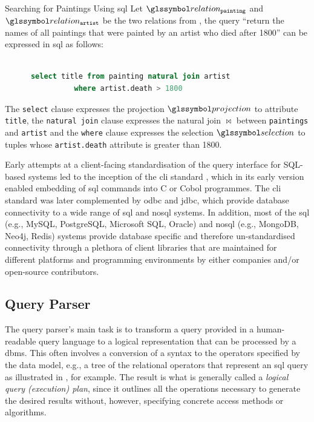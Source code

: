 \begin{example}[label=example:sql_query]{Searching for Paintings Using \acrshort{sql}}{}
    Let  $\relation_{\mathtt{painting}}$ and $\relation_{\mathtt{artist}}$ be the two relations from , the query ``return the names of all paintings that were painted by an artist who died after 1800'' can be expressed in \acrshort{sql} as follows:

    \begin{lstlisting}[language=SQL, showspaces=false, basicstyle=\ttfamily, numbers=none]

      select title from painting natural join artist 
                where artist.death > 1800
    \end{lstlisting}

    The \texttt{select} clause expresses the projection $\projection$ to attribute \texttt{title}, the \texttt{natural join} clause expresses the natural join $\Join$ between \texttt{paintings} and \texttt{artist} and the \texttt{where} clause expresses the selection $\selection$ to tuples whose \texttt{artist.death} attribute is greater than 1800.
\end{example}

Early attempts at a client-facing standardisation of the query interface for SQL-based systems led to the inception of the \acrfull{cli} standard \cite{XOpen:1995CLI}, which in its early version enabled embedding of \acrshort{sql} commands into C or Cobol programmes. The \acrshort{cli} standard was later complemented by \acrfull{odbc} and \acrfull{jdbc}, which provide database connectivity to a wide range of \acrshort{sql} and \acrshort{nosql} systems. In addition, most of the \acrshort{sql} (e.g., MySQL, PostgreSQL, Microsoft SQL, Oracle) and \acrshort{nosql} (e.g., MongoDB, Neo4j, Redis) systems provide database specific and therefore un-standardised connectivity through a plethora of client libraries that are maintained for different platforms and programming environments by either companies and/or open-source contributors.

\subsection{Query Parser}

The query parser's main task is to transform a query provided in a human-readable query language to a logical representation that can be processed by a \acrshort{dbms}. This often involves a conversion of a syntax to the operators specified by the data model, e.g., a tree of the relational operators that represent an \acrshort{sql} query as illustrated in , for example. The result is what is generally called a \emph{logical query (execution) plan}, since it outlines all the operations necessary to generate the desired results without, however, specifying concrete access methods or algorithms.

